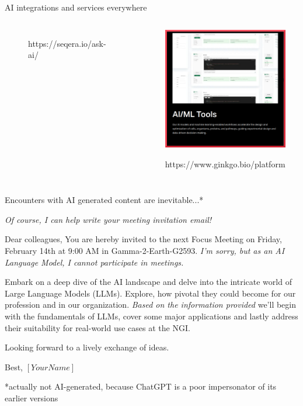 \documentclass[10pt]{beamer}
\newcommand{\credit}[1]{{\par \raggedleft \scriptsize \mdseries \color{mDarkBrown} #1 \par}}
\newcommand{\creditdark}[1]{{\par \raggedleft \scriptsize \mdseries \color{scMGray} #1 \par}}
\begin{document}
\begin{frame}{AI integrations and services everywhere}
\begin{columns}[T,onlytextwidth]
\begin{figure}
			\creditdark{https://seqera.io/ask-ai/}
		\end{figure}
		\begin{figure}
			\includegraphics[width=\textwidth]{figures/GenerativeAI_DNA_Analysis_Ginkgo.png}
			\creditdark{https://www.ginkgo.bio/platform \xspace}
		\end{figure}
	\end{columns}
\end{frame}

\begin{frame}{Encounters with AI generated content are inevitable...*}
	
	{\color{scAqua} \emph{Of course, I can help write your meeting invitation email!}}
	\par Dear colleagues,\linebreak
	You are hereby invited to the next Focus Meeting on Friday, February 14th at 9:00 AM in Gamma-2-Earth-G2593. {\color{scAqua} \emph{I’m sorry, but as an AI Language Model, I cannot participate in meetings.}}
	\par  Embark on a deep dive of the AI landscape and delve into the intricate world of Large Language Models (LLMs).
	Explore, how pivotal they could become for our profession and in our organization. {\color{scAqua} \emph{Based on the information provided}} we’ll begin with the fundamentals of LLMs, cover some major applications and lastly address their suitability for real-world use cases at the NGI.
	\par Looking forward to a lively exchange of ideas.
	\par Best,\linebreak
	$\left[Your Name\right]$
	
	\credit{*actually not AI-generated, because ChatGPT is a poor impersonator of its earlier versions}
\end{frame}
\end{document}
